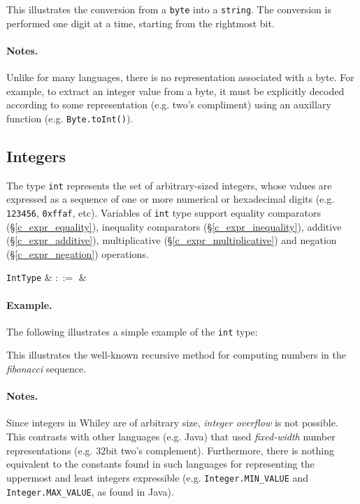 

This illustrates the conversion from a \lstinline{byte} into a \lstinline{string}.  The conversion is performed one digit at a time, starting from the rightmost bit.

\paragraph{Notes.}  Unlike for many languages, there is no representation associated with a byte. For example, to extract an integer value from a byte, it must be explicitly decoded according to some representation (e.g. two's compliment) using an auxillary function (e.g. \lstinline{Byte.toInt()}).



\subsection{Integers}
\label{c_types_int}

The type \lstinline{int} represents the set of arbitrary-sized integers, whose values are expressed as a sequence of one or more numerical or hexadecimal digits (e.g. \lstinline{123456}, \lstinline{0xffaf}, etc).  Variables of \lstinline{int} type support equality comparators (\S\ref{c_expr_equality}), inequality comparators (\S\ref{c_expr_inequality}), additive (\S\ref{c_expr_additive}), multiplicative (\S\ref{c_expr_multiplicative}) and negation (\S\ref{c_expr_negation}) operations.


\begin{syntax}
  \verb+IntType+ & $::=$ &  \\
\end{syntax}

\paragraph{Example.} The following illustrates a simple example of the \lstinline{int} type:



This illustrates the well-known recursive method for computing numbers in the {\em fibonacci} sequence.

\paragraph{Notes.}  Since integers in Whiley are of arbitrary size, {\em integer overflow} is not possible.  This contrasts with other languages (e.g. Java) that used {\em fixed-width} number representations (e.g. 32bit two's complement).  Furthermore, there is nothing equivalent to the constants found in such languages for representing the uppermost and least integers expressible (e.g. \lstinline{Integer.MIN_VALUE} and \lstinline{Integer.MAX_VALUE}, as found in Java).

